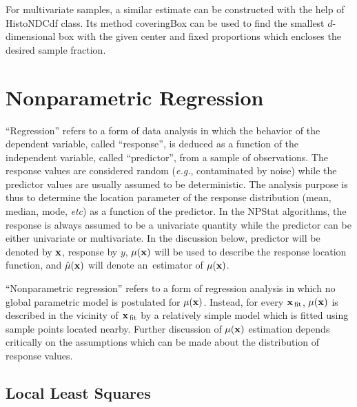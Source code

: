 \documentclass[12pt,titlepage]{article}
\newcommand{\sub}[1]{\ensuremath{_{\mbox{\scriptsize \,#1}}}}
\newcommand{\cname}[1]{\index{#1}\textsf{#1}}
\begin{document}
For multivariate samples, a similar estimate can be constructed with
the help of \cname{HistoNDCdf} class. Its method \cname{coveringBox}
can be used to find the smallest $d$-dimensional box with the given center
and fixed proportions which encloses the desired sample fraction.


\section{Nonparametric Regression}
\label{sec:npregression}

``Regression'' refers to a form of data analysis
in which the behavior of the dependent variable, called ``response'',
is deduced as a function of the independent variable, called ``predictor'',
from a sample of observations.
The response values are considered random ({\it e.g.}, contaminated by
noise) while the predictor values are usually assumed to be deterministic.
The analysis purpose is thus to determine the location parameter
of the response distribution
(mean, median, mode, {\it etc}) as a function of the predictor.
In the NPStat algorithms, the response is always assumed to be a
univariate quantity while the predictor can be either univariate or
multivariate. In the discussion below, predictor will be denoted
by ${\bf x}$, response by $y$, $\mu({\bf x})$ will be used
to describe the response location function, and $\hat{\mu}({\bf x})$
will denote an~estimator of $\mu({\bf x})$.

``Nonparametric regression'' refers to a form of regression analysis
in which no global parametric model is postulated for $\mu({\bf x})$.
Instead, for every ${\bf x}\sub{fit}$, $\mu({\bf x})$ is described 
in the vicinity of ${\bf x}\sub{fit}$ by a relatively
simple model which is fitted using sample points located nearby.
Further discussion of $\mu({\bf x})$ estimation depends critically
on the assumptions which can be made about the distribution of
response values.


\subsection{Local Least Squares}
\end{document}
